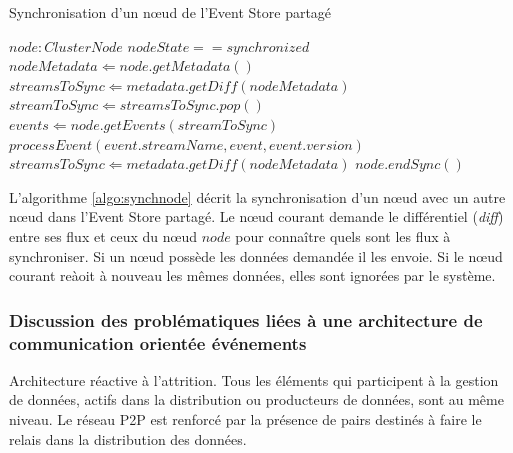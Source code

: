 



\begin{algorithm} %
	\caption{Synchronisation d'un n\oe ud de l'Event Store partagé} %
	\label{algo:synchnode} %
	\begin{algorithmic} %
		\REQUIRE $node : ClusterNode$
		\ENSURE $nodeState == synchronized$
		\STATE $nodeMetadata \Leftarrow node.getMetadata()$
		\STATE $streamsToSync \Leftarrow metadata.getDiff(nodeMetadata)$
		\STATE $streamToSync \Leftarrow streamsToSync.pop()$
		\STATE $events \Leftarrow  node.getEvents(streamToSync)$
		\STATE $processEvent(event.streamName, event, 
		event.version)$
		\ENDFOR 
		\ENDIF
		\STATE $streamsToSync \Leftarrow metadata.getDiff(nodeMetadata)$
		\ENDWHILE
		\ENDIF
		\STATE $node.endSync()$
	\end{algorithmic}
\end{algorithm}

L'algorithme \ref{algo:synchnode} décrit la synchronisation d'un n\oe ud avec un 
autre n\oe ud dans l'Event Store partagé. Le n\oe ud courant demande le 
différentiel (\textit{diff}) entre ses flux et ceux du n\oe ud $node$ pour 
connaître quels sont les flux à synchroniser. Si un n\oe ud possède les données 
demandée il les envoie. Si le n\oe ud courant reàoit à nouveau les mêmes 
données, elles sont ignorées par le système.






\subsubsection{Discussion des problématiques liées à une architecture de 
communication orientée \og événements\fg{}}
Architecture réactive à l'attrition. Tous les éléments qui participent à la gestion de 
données, actifs dans la distribution ou producteurs de données, sont au même 
niveau. Le réseau \gls{P2P} est renforcé par la présence de pairs destinés à 
faire le relais dans la distribution des données. 

